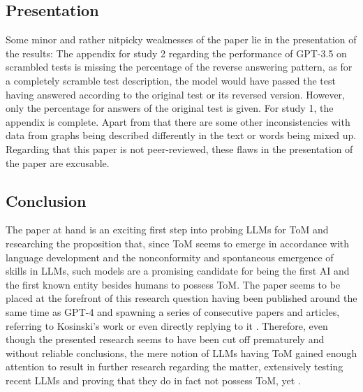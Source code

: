 \subsection{Presentation}
Some minor and rather nitpicky weaknesses of the paper lie in the presentation of the results: The appendix for study 2 regarding the performance of GPT-3.5 on scrambled tests is missing the percentage of the reverse answering pattern, as for a completely scramble test description, the model would have passed the test having answered according to the original test or its reversed version. However, only the percentage for answers of the original test is given. For study 1, the appendix is complete. Apart from that there are some other inconsistencies with data from graphs being described differently in the text or words being mixed up.
Regarding that this paper is not peer-reviewed, these flaws in the presentation of the paper are excusable.

\subsection{Conclusion}
The paper at hand is an exciting first step into probing LLMs for ToM and researching the proposition that, since ToM seems to emerge in accordance with language development and the nonconformity and spontaneous emergence of skills in LLMs, such models are a promising candidate for being the first AI and the first known entity besides humans to possess ToM. The paper seems to be placed at the forefront of this research question having been published around the same time as GPT-4 and spawning a series of consecutive papers and articles, referring to Kosinski's work or even directly replying to it \cite{critics1,critics2,critics3}. Therefore, even though the presented research seems to have been cut off prematurely and without reliable conclusions, the mere notion of LLMs having ToM gained enough attention to result in further research regarding the matter, extensively testing recent LLMs and proving that they do in fact not possess ToM, yet \cite{critics1,critics3}.